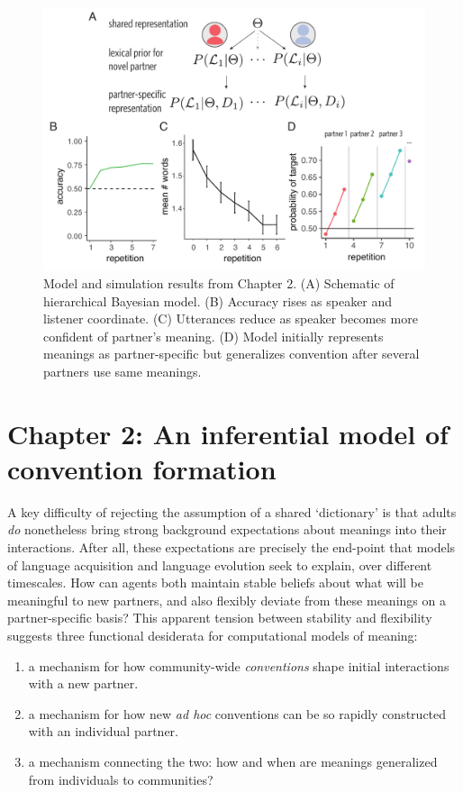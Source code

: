 \documentclass[11pt]{article}
\begin{document}
\begin{figure}[t!]
\centering
\includegraphics[scale=.85]{chapter2}
\caption{\small Model and simulation results from Chapter 2. (A) Schematic of hierarchical Bayesian model. (B) Accuracy rises as speaker and listener coordinate. (C) Utterances reduce as speaker becomes more confident of partner's meaning. (D) Model initially represents meanings as partner-specific but generalizes convention after several partners use same meanings.}
\label{fig:chapter2}
\end{figure}

\section*{Chapter 2: An inferential model of convention formation}

A key difficulty of rejecting the assumption of a shared `dictionary' is that adults \emph{do} nonetheless bring strong background expectations about meanings into their interactions. 
After all, these expectations are precisely the end-point that models of language acquisition and language evolution seek to explain, over different timescales.
How can agents both maintain stable beliefs about what will be meaningful to new partners, and also flexibly deviate from these meanings on a partner-specific basis?
This apparent tension between stability and flexibility suggests three functional desiderata for computational models of meaning:

\begin{enumerate}
\item a mechanism for how community-wide \emph{conventions} \cite{Lewis69_Convention} shape initial interactions with a new partner.\vspace{-.75em}
\item a mechanism for how new \emph{ad hoc} conventions can be so rapidly constructed with an individual partner.\vspace{-.75em}
\item a mechanism connecting the two: how and when are meanings generalized from individuals to communities?
\end{enumerate}
\end{document}
